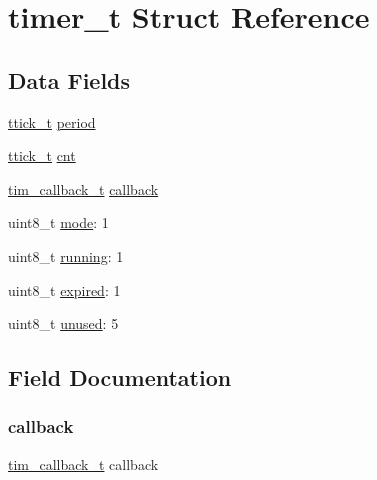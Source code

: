 \hypertarget{structtimer__t}{}\section{timer\+\_\+t Struct Reference}
\label{structtimer__t}
\subsection*{Data Fields}
\begin{DoxyCompactItemize}
\item 
\mbox{\hyperlink{_d_r_v___timers_8h_a21588d564d58c0716d3901da569691db}{ttick\+\_\+t}} \mbox{\hyperlink{structtimer__t_a976c363fce8b06537399ab30e6f7c03b}{period}}
\item 
\mbox{\hyperlink{_d_r_v___timers_8h_a21588d564d58c0716d3901da569691db}{ttick\+\_\+t}} \mbox{\hyperlink{structtimer__t_a3980dcfb7fcff9f9cee05b4161a9947f}{cnt}}
\item 
\mbox{\hyperlink{_d_r_v___timers_8h_a0b70e2941dede906fc97d15b026a16e1}{tim\+\_\+callback\+\_\+t}} \mbox{\hyperlink{structtimer__t_aa37654455bc7491ab30941da9afee3d6}{callback}}
\item 
uint8\+\_\+t \mbox{\hyperlink{structtimer__t_a37e90f5e3bd99fac2021fb3a326607d4}{mode}}\+: 1
\item 
uint8\+\_\+t \mbox{\hyperlink{structtimer__t_af77f8244799e85284b8b438289f5f689}{running}}\+: 1
\item 
uint8\+\_\+t \mbox{\hyperlink{structtimer__t_a15d0425d06d715ce5e278c8c0a70c662}{expired}}\+: 1
\item 
uint8\+\_\+t \mbox{\hyperlink{structtimer__t_af3138032961911b5742b4344e37f43d4}{unused}}\+: 5
\end{DoxyCompactItemize}


\subsection{Field Documentation}
\mbox{\label{structtimer__t_aa37654455bc7491ab30941da9afee3d6}} 
\subsubsection{\texorpdfstring{callback}{callback}}
{\footnotesize\ttfamily \mbox{\hyperlink{_d_r_v___timers_8h_a0b70e2941dede906fc97d15b026a16e1}{tim\+\_\+callback\+\_\+t}} callback}

